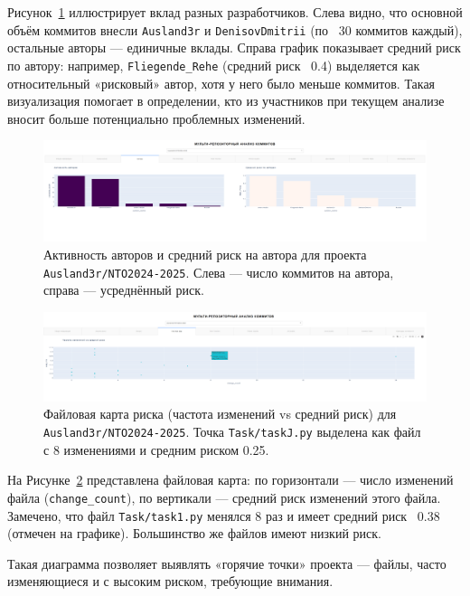 Рисунок~\ref{fig:authors} иллюстрирует вклад разных разработчиков. Слева видно, что основной объём коммитов внесли \texttt{Ausland3r} и \texttt{DenisovDmitrii} (по ~30 коммитов каждый), остальные авторы — единичные вклады. Справа график показывает средний риск по автору: например, \texttt{Fliegende\_Rehe} (средний риск ~0.4) выделяется как относительный «рисковый» автор, хотя у него было меньше коммитов. Такая визуализация помогает в определении, кто из участников при текущем анализе вносит больше потенциально проблемных изменений.

 \begin{figure}[ht]
	\centering
	\includegraphics[width=\textwidth]{my_folder/images/third_page.png}
	\caption{Активность авторов и средний риск на автора для проекта \texttt{Ausland3r/NTO2024-2025}. Слева — число коммитов на автора, справа — усреднённый риск.}
	\label{fig:authors}
\end{figure}
 \begin{figure}[ht]
	\centering
	\includegraphics[width=\textwidth]{my_folder/images/forth_page.png}
	\caption{Файловая карта риска (частота изменений vs средний риск) для \texttt{Ausland3r/NTO2024-2025}. Точка \texttt{Task/taskJ.py} выделена как файл с 8 изменениями и средним риском 0.25.}
	\label{fig:file_risk}
\end{figure}

На Рисунке~\ref{fig:file_risk} представлена файловая карта: по горизонтали — число изменений файла (\texttt{change\_count}), по вертикали — средний риск изменений этого файла. Замечено, что файл \texttt{Task/task1.py} менялся 8 раз и имеет средний риск ~0.38 (отмечен на графике). Большинство же файлов имеют низкий риск. 

Такая диаграмма позволяет выявлять «горячие точки» проекта — файлы, часто изменяющиеся и с высоким риском, требующие внимания. 


